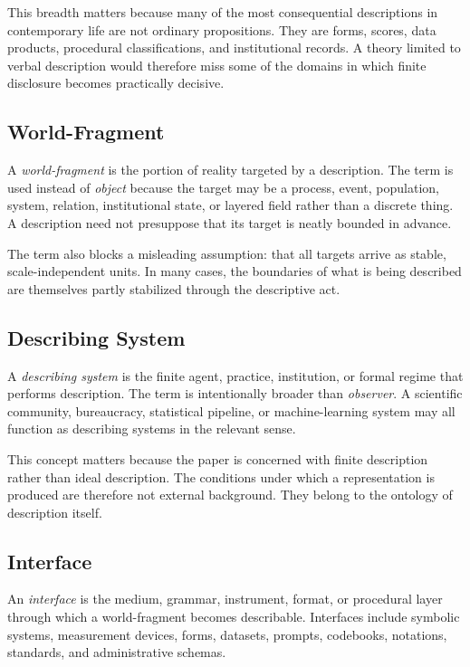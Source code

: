 \documentclass[11pt]{article}
\renewcommand{\emph}[1]{\textit{#1}}
\begin{document}
This breadth matters because many of the most consequential descriptions in contemporary life are not ordinary propositions. They are forms, scores, data products, procedural classifications, and institutional records. A theory limited to verbal description would therefore miss some of the domains in which finite disclosure becomes practically decisive.

\subsection{World-Fragment}

A \emph{world-fragment} is the portion of reality targeted by a description. The term is used instead of \emph{object} because the target may be a process, event, population, system, relation, institutional state, or layered field rather than a discrete thing. A description need not presuppose that its target is neatly bounded in advance.

The term also blocks a misleading assumption: that all targets arrive as stable, scale-independent units. In many cases, the boundaries of what is being described are themselves partly stabilized through the descriptive act.

\subsection{Describing System}

A \emph{describing system} is the finite agent, practice, institution, or formal regime that performs description. The term is intentionally broader than \emph{observer}. A scientific community, bureaucracy, statistical pipeline, or machine-learning system may all function as describing systems in the relevant sense.

This concept matters because the paper is concerned with finite description rather than ideal description. The conditions under which a representation is produced are therefore not external background. They belong to the ontology of description itself.

\subsection{Interface}

An \emph{interface} is the medium, grammar, instrument, format, or procedural layer through which a world-fragment becomes describable. Interfaces include symbolic systems, measurement devices, forms, datasets, prompts, codebooks, notations, standards, and administrative schemas. \cite{adriaans_information_sep,star_ethnography_of_infrastructure,bowker_star_sorting_things_out}
\end{document}
